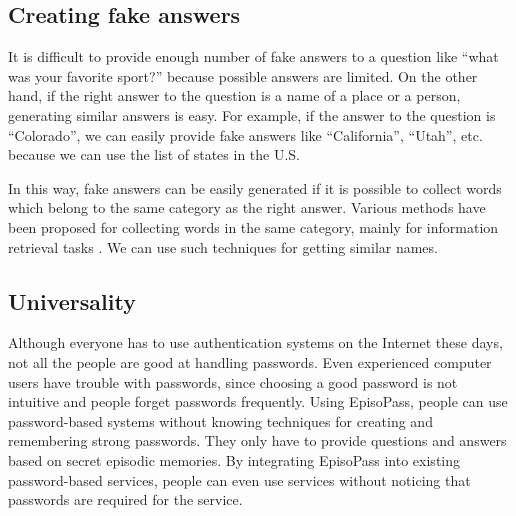 \documentclass{sigchi}
\begin{document}
\subsection{Creating fake answers}


It is difficult to provide enough number of fake answers to a question like
``what was your favorite sport?''
because possible answers are limited.
%
%
%
On the other hand, if the right answer to the question is a name of a place or a person,
generating similar answers is easy.
For example, if the answer to the question is ``Colorado'',
we can easily provide fake answers like ``California'', ``Utah'', etc.
because we can use the list of states in the U.S.

In this way, fake answers can be easily generated
if it is possible to collect words which belong to the same
category as the right answer.
%
Various methods have been proposed for collecting words in the
same category, mainly for information retrieval tasks%
\cite{Huang:2012:LFC:2426725.2426728}%
\cite{BooWa}%
\cite{Wang:2007:LSE:1441428.1442086}.%
We can use such techniques for getting similar names.

\subsection{Universality}

Although everyone has to use authentication systems on the Internet these days,
not all the people are good at handling passwords.
Even experienced computer users have trouble with passwords,
since choosing a good password is not intuitive and
people forget passwords frequently.
%
Using EpisoPass, people can use password-based systems without knowing
techniques for creating and remembering strong passwords.
They only have to provide
questions and answers based on secret episodic memories.
%
By integrating EpisoPass into existing password-based services,
people can even use services without noticing that passwords are
required for the service.
\end{document}
